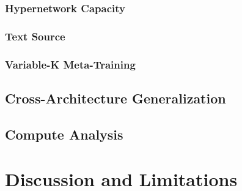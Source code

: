 \documentclass{article}
\begin{document}
\subsubsection{Hypernetwork Capacity}

\subsubsection{Text Source}

\subsubsection{Variable-K Meta-Training}

\subsection{Cross-Architecture Generalization}

\subsection{Compute Analysis}

\section{Discussion and Limitations}

\end{document}
